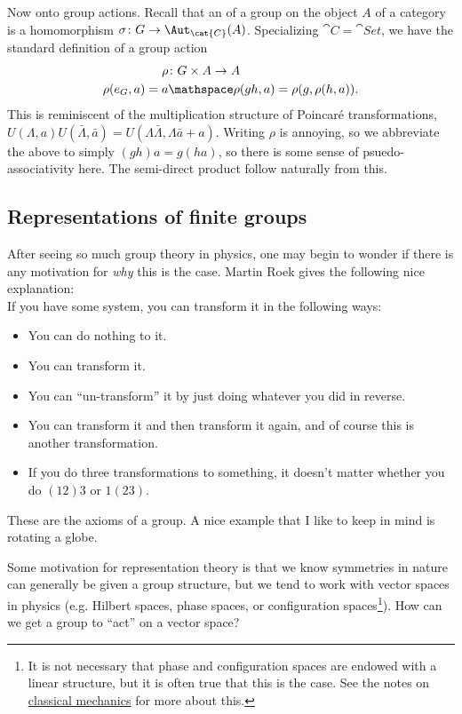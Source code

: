 \documentclass[11pt]{article}
\begin{document}
Now onto group actions. Recall that an  of a 
group on the object $A$ of a category  is a homomorphism
$\sigma \colon G \to \Aut_{\cat{C}}(A)$. Specializing 
$\cat{C} = \cat{Set}$, we have the standard definition of a group action
\begin{align*}
    \rho & \colon G \times A \to A\\
    \rho(e_G, a) = a
    & \mathspace
    \rho(gh, a) = \rho(g, \rho(h, a)).
\end{align*}
This is reminiscent of the multiplication structure of 
Poincaré transformations, 
$U(\Lambda, a)U(\bar{\Lambda}, \bar{a}) = U(\Lambda \bar{\Lambda}, \Lambda \bar{a} + a)$.
Writing $\rho$ is annoying, so we abbreviate the above
to simply $(gh)a = g(ha)$, so there is some sense of psuedo-associativity
here. The semi-direct product follow naturally from this.

\subsection{Representations of finite groups}

\begin{reemark}
    After seeing so much group theory in physics, one may begin to
    wonder if there is any motivation for \emph{why} this is the case.
    Martin Roek gives the following nice explanation:\\
    
    \noin
    If you have some system, you can transform it in the following
    ways:
    \begin{itemize}
        \item You can do nothing to it.
        \item You can transform it.
        \item You can ``un-transform'' it by just doing whatever you did
        in reverse.
        \item You can transform it and then transform it again,
        and of course this is another transformation.
        \item If you do three transformations to something,
        it doesn't matter whether you do $(12)3$ or $1(23)$.
    \end{itemize}
    These are the axioms of a group. A nice example that I like
    to keep in mind is rotating a globe.
\end{reemark}

Some motivation for representation theory is that we
know symmetries in nature can generally be given a group structure,
but we tend to work with vector spaces in physics (e.g. Hilbert
spaces, phase spaces, or configuration spaces\footnote{It is
not necessary that phase and configuration spaces are endowed with a linear
structure, but it is often true that this is the case.
See the notes on 
\href{https://github.com/will-lancer/notes/blob/main/Physics/Four_Mechanics/FourMechanics.pdf}{classical mechanics} 
for more about this.}).
How can we get a group to ``act'' on a vector space?
\end{document}
